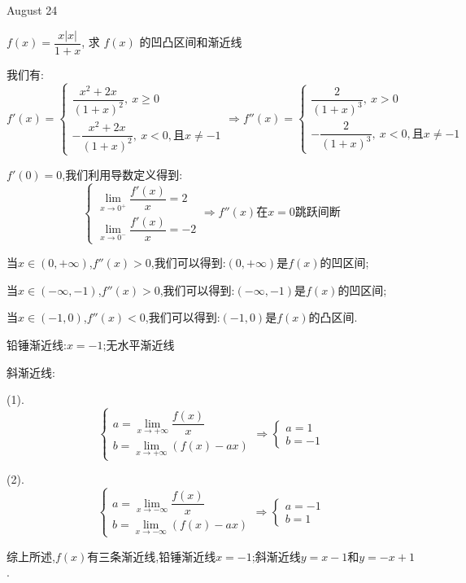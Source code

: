 \textcolor{purplea}{August 24}

\begin{example}[][Exam: 34.4.5]
	$f(x)=\dfrac{x|x|}{1+x}$, 求 $f(x)$ 的凹凸区间和渐近线
\end{example}

\begin{solution}

	我们有:  
	$$f'(x)=\left\lbrace
	\begin{array}{l}
		\dfrac{x^2+2x}{(1+x)^2},\ x\geq 0\\
		-\dfrac{x^2+2x}{(1+x)^2},\ x<0,\text{且}x\neq -1
	\end{array}
	\right. \Rightarrow f''(x)=\left\lbrace
	\begin{array}{l}
		\dfrac{2}{(1+x)^3},\ x>0\\
		-\dfrac{2}{(1+x)^3},\ x<0,\text{且}x\neq -1
	\end{array}
	\right. $$
	
	$f'(0)=0$,我们利用导数定义得到:  
	$$\left\lbrace
	\begin{array}{l}
		\lim\limits_{x\to 0^{+}}\dfrac{f'(x)}{x}=2\\
		\lim\limits_{x\to 0^{-}}\dfrac{f'(x)}{x}=-2
	\end{array}
	\right. \Rightarrow f''(x)\text{在}x=0\text{跳跃间断}$$
	
	当$x\in(0,+\infty)$,$f''(x)>0$,我们可以得到:$(0,+\infty)$是$f(x)$的凹区间;
	
	当$x\in(-\infty,-1)$,$f''(x)>0$,我们可以得到:$(-\infty,-1)$是$f(x)$的凹区间;
	
	当$x\in(-1,0)$,$f''(x)<0$,我们可以得到:$(-1,0)$是$f(x)$的凸区间.
	
	铅锤渐近线:$x=-1$;无水平渐近线
	
	斜渐近线:  
	
	(1).
	$$\left\lbrace
	\begin{array}{l}
		a=\lim\limits_{x\to+\infty}\dfrac{f(x)}{x}\\
		b=\lim\limits_{x\to+\infty}(f(x)-ax)
	\end{array}
	\right. \Rightarrow\left\lbrace
	\begin{array}{l}
		a=1\\
		b=-1
	\end{array}
	\right. $$
	
	(2).
	$$\left\lbrace
	\begin{array}{l}
		a=\lim\limits_{x\to-\infty}\dfrac{f(x)}{x}\\
		b=\lim\limits_{x\to-\infty}(f(x)-ax)
	\end{array}
	\right. \Rightarrow\left\lbrace
	\begin{array}{l}
		a=-1\\
		b=1
	\end{array}
	\right. $$
	
	综上所述,$f(x)$有三条渐近线,铅锤渐近线$x=-1$;斜渐近线$y=x-1$和$y=-x+1$.
\end{solution}

